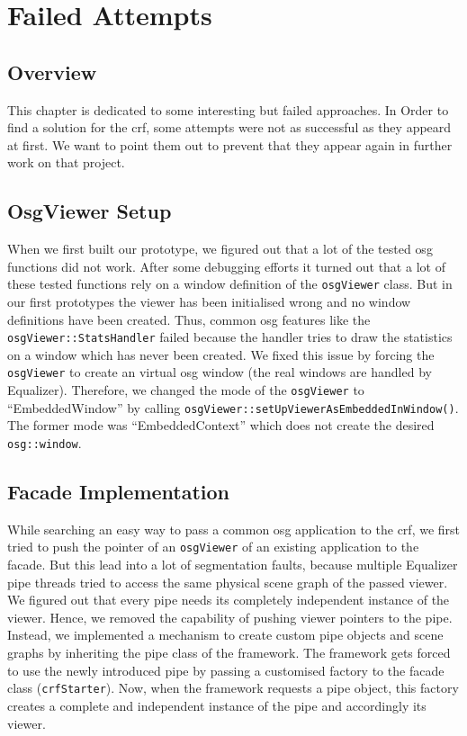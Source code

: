 \nopagebreak
\chapter{Failed Attempts}
\section{Overview}
This chapter is dedicated to some interesting but failed approaches. In Order to find a solution for the \gls{crf}, some attempts were not as successful as they appeard at first. We want to point them out to prevent that they appear again in further work on that project.

\section{OsgViewer Setup}
When we first built our prototype, we figured out that a lot of the tested \gls{osg} functions did not work. After some debugging efforts it turned out that a lot of these tested functions rely on a window definition of the \texttt{osgViewer} class. But in our first prototypes the viewer has been initialised wrong and no window definitions have been created. Thus, common \gls{osg} features like the \texttt{osgViewer::StatsHandler} failed because the handler tries to draw the statistics on a window which has never been created. We fixed this issue by forcing the \texttt{osgViewer} to create an virtual \gls{osg} window (the real windows are handled by Equalizer). Therefore, we changed the mode of the \texttt{osgViewer} to ``EmbeddedWindow'' by calling \texttt{osgViewer::setUpViewerAsEmbeddedInWindow()}. The former mode was ``EmbeddedContext'' which does not create the desired \texttt{osg::window}.

\section{Facade Implementation}
While searching an easy way to pass a common \gls{osg} application to the \gls{crf}, we first tried to push the pointer of an \texttt{osgViewer} of an existing application to the facade. But this lead into a lot of segmentation faults, because multiple Equalizer pipe threads tried to access the same physical scene graph of the passed viewer. We figured out that every pipe needs its completely independent instance of the viewer. Hence, we removed the capability of pushing viewer pointers to the pipe. Instead, we implemented a mechanism to create custom pipe objects and scene graphs by inheriting the pipe class of the framework. The framework gets forced to use the newly introduced pipe by passing a customised factory to the facade class (\texttt{crfStarter}). Now, when the framework requests a pipe object, this factory creates a complete and independent instance of the pipe and accordingly its viewer.

